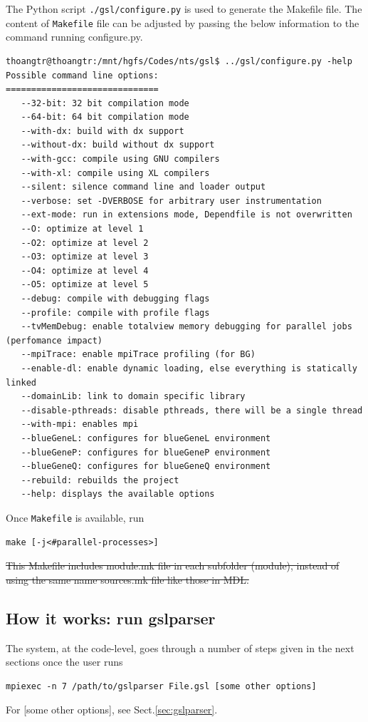 The Python script \verb!./gsl/configure.py! is used to generate the Makefile
file. The content of \verb!Makefile! file can be adjusted by passing the below
information to the command running configure.py.

{\tiny
\begin{verbatim}
thoangtr@thoangtr:/mnt/hgfs/Codes/nts/gsl$ ../gsl/configure.py -help
Possible command line options:
==============================
   --32-bit: 32 bit compilation mode
   --64-bit: 64 bit compilation mode
   --with-dx: build with dx support
   --without-dx: build without dx support
   --with-gcc: compile using GNU compilers
   --with-xl: compile using XL compilers
   --silent: silence command line and loader output
   --verbose: set -DVERBOSE for arbitrary user instrumentation
   --ext-mode: run in extensions mode, Dependfile is not overwritten
   --O: optimize at level 1
   --O2: optimize at level 2
   --O3: optimize at level 3
   --O4: optimize at level 4
   --O5: optimize at level 5
   --debug: compile with debugging flags
   --profile: compile with profile flags
   --tvMemDebug: enable totalview memory debugging for parallel jobs (perfomance impact)
   --mpiTrace: enable mpiTrace profiling (for BG)
   --enable-dl: enable dynamic loading, else everything is statically linked
   --domainLib: link to domain specific library
   --disable-pthreads: disable pthreads, there will be a single thread
   --with-mpi: enables mpi
   --blueGeneL: configures for blueGeneL environment
   --blueGeneP: configures for blueGeneP environment
   --blueGeneQ: configures for blueGeneQ environment
   --rebuild: rebuilds the project
   --help: displays the available options
\end{verbatim}
}

Once \verb!Makefile! is available, run
\begin{verbatim}
make [-j<#parallel-processes>] 
\end{verbatim}

\sout{This Makefile includes module.mk file in each subfolder
(module), instead of using the same name sources.mk file like those in
MDL.}

\subsection{How it works: run gslparser}
\label{sec:gslparser-how-to-run}
\label{sec:Topology.h}

The system, at the code-level, goes through a number of steps given in the
next sections once the user runs
\begin{verbatim}
mpiexec -n 7 /path/to/gslparser File.gsl [some other options]
\end{verbatim}
For [some other options], see Sect.\ref{sec:gslparser}.

